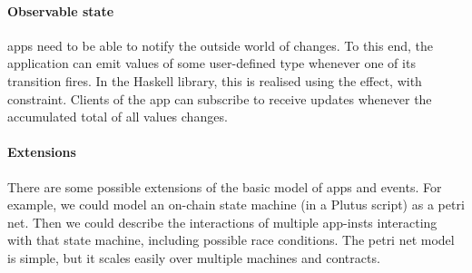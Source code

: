 \paragraph{Observable state}

\glspl{app} need to be able to notify the outside world of changes.
To this end, the application can emit values of some user-defined type  whenever one of its transition fires.
In the Haskell library, this is realised using the  effect, with  constraint.
Clients of the \gls{app} can subscribe to receive updates whenever the accumulated total of all values changes.

\paragraph{Extensions}

There are some possible extensions of the basic model of apps and events.
For example, we could model an on-chain state machine (in a Plutus script) as a petri net.
Then we could describe the interactions of multiple \glspl{app-inst} interacting with that state machine, including possible race conditions.
The petri net model is simple, but it scales easily over multiple machines and contracts.
